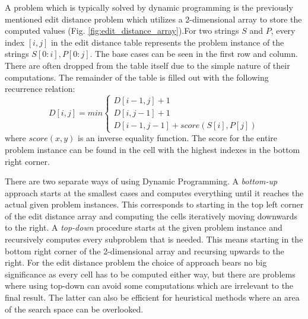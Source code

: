 \documentclass[thesis.tex]{subfiles}
\begin{document}
A problem which is typically solved by dynamic programming is the previously mentioned edit distance problem which utilizes a 2-dimensional array to store the computed values (Fig. \ref{fig:edit_distance_array}).For two strings $S$ and $P$, every index $[i,j]$ in the edit distance table represents the problem instance of the strings $S[0:i],P[0:j]$. The base cases can be seen in the first row and column. There are often dropped from the table itself due to the simple nature of their computations. The remainder of the table is filled out with the following recurrence relation:
\begin{equation}
  D[i,j] = min
  \begin{cases}
    D[i-1,j] + 1\\
    D[i,j-1] + 1\\
    D[i-1,j-1] + score(S[i], P[j])
  \end{cases}
  \label{eq:ed_recurrence_relation}
\end{equation}
where $score(x, y)$ is an inverse equality function. The score for the entire problem instance can be found in the cell with the highest indexes in the bottom right corner.\\
\par\noindent
There are two separate ways of using Dynamic Programming. A \textit{bottom-up} approach starts at the smallest cases and computes everything until it reaches the actual given problem instances. This corresponds to starting in the top left corner of the edit distance array and computing the cells iteratively moving downwards to the right. A \textit{top-down} procedure starts at the given problem instance and recursively computes every subproblem that is needed. This means starting in the bottom right corner of the 2-dimensional array and recursing upwards to the right. For the edit distance problem the choice of approach bears no big significance as every cell has to be computed either way, but there are problems where using top-down can avoid some computations which are irrelevant to the final result. The latter can also be efficient for heuristical methods where an area of the search space can be overlooked.
\end{document}

